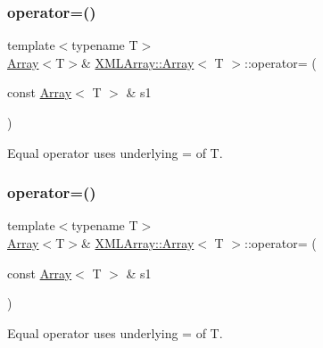 \subsubsection{\texorpdfstring{operator=()}{operator=()}\hspace{0.1cm}{\footnotesize\ttfamily [1/6]}}
{\footnotesize\ttfamily template$<$typename T$>$ \\
\mbox{\hyperlink{classXMLArray_1_1Array}{Array}}$<$T$>$\& \mbox{\hyperlink{classXMLArray_1_1Array}{X\+M\+L\+Array\+::\+Array}}$<$ T $>$\+::operator= (\begin{DoxyParamCaption}\item[{const \mbox{\hyperlink{classXMLArray_1_1Array}{Array}}$<$ T $>$ \&}]{s1 }\end{DoxyParamCaption})\hspace{0.3cm}{\ttfamily [inline]}}



Equal operator uses underlying = of T. 

\mbox{\label{classXMLArray_1_1Array_a99fd481573c47ab9a9e35ed597575b0e}} 
\subsubsection{\texorpdfstring{operator=()}{operator=()}\hspace{0.1cm}{\footnotesize\ttfamily [2/6]}}
{\footnotesize\ttfamily template$<$typename T$>$ \\
\mbox{\hyperlink{classXMLArray_1_1Array}{Array}}$<$T$>$\& \mbox{\hyperlink{classXMLArray_1_1Array}{X\+M\+L\+Array\+::\+Array}}$<$ T $>$\+::operator= (\begin{DoxyParamCaption}\item[{const \mbox{\hyperlink{classXMLArray_1_1Array}{Array}}$<$ T $>$ \&}]{s1 }\end{DoxyParamCaption})\hspace{0.3cm}{\ttfamily [inline]}}



Equal operator uses underlying = of T. 

\mbox{\label{classXMLArray_1_1Array_a3051ecb95c6d07f9ad80e72a2fd50c61}} 

